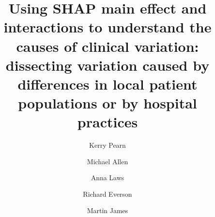 
\title{Using SHAP main effect and interactions to understand the causes of clinical variation: dissecting variation caused by differences in local patient populations or by hospital practices}


\renewcommand{\thefootnote}{\fnsymbol{footnote}}
\author[1,2]{Kerry Pearn}
\author[*1,2]{Michael Allen}
\author[1,2]{Anna Laws}
\author[4]{Richard Everson}
\author[2,3]{Martin James}

